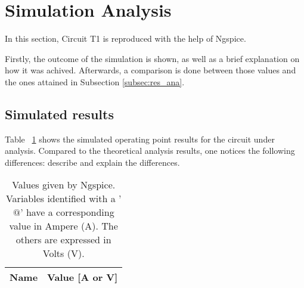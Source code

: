 \section{Simulation Analysis}
\label{sec:simulation}


In this section, Circuit T1 is reproduced with the help of Ngspice.

Firstly, the outcome of the simulation is shown, as well as a brief explanation
on how it was achived. Afterwards, a comparison is done between those values and
the ones attained in Subsection \ref{subsec:res_ana}.




\subsection{Simulated results}
\label{sim_res}



Table ~\ref{tab:op} shows the simulated operating point results for the circuit
under analysis. Compared to the theoretical analysis results, one notices the
following differences: describe and explain the differences.



\begin{table}[h]
	\centering
	\begin{tabular}{|l|r|}
		\hline    
		{\bf Name} & {\bf Value [A or V]} \\ \hline
    		
	\end{tabular}
	
	\caption{Values given by Ngspice. Variables identified with a '$@$' have a
  	corresponding value in Ampere (A). The others are expressed in Volts (V).}
    
\label{tab:op}
\end{table}


